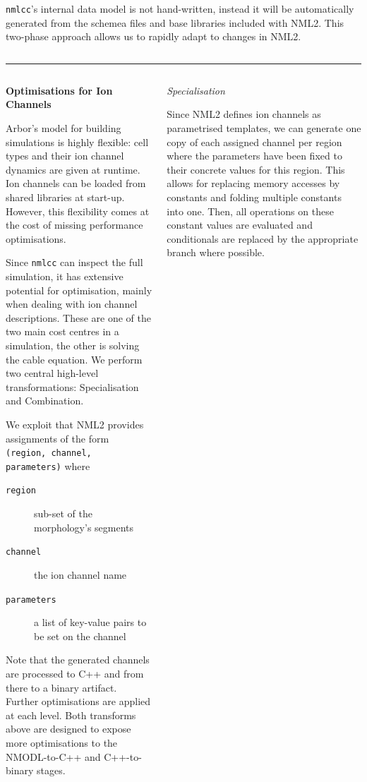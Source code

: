 \documentclass{beamer}
\begin{document}
\begin{frame}[t, fragile]
\begin{columns}
\begin{column}{0.49\textwidth}
      \texttt{nmlcc}'s internal data model is not hand-written, instead it will
      be automatically generated from the schemea files and base libraries
      included with NML2. This two-phase approach allows us to rapidly adapt to
      changes in NML2.
    \end{column}
  \end{columns}
  \vspace*{1ex}
  \textcolor{arborange}{\rule{\textwidth}{0.5ex}}
  \vspace*{-1ex}
  \begin{columns}
    \begin{column}{0.49\textwidth}
      \textbf{Optimisations for Ion Channels}

      Arbor's model for building simulations is highly flexible: cell types and
      their ion channel dynamics are given at runtime. Ion channels can be
      loaded from shared libraries at start-up. However, this flexibility comes
      at the cost of missing performance optimisations.

      Since \texttt{nmlcc} can inspect the full simulation, it has extensive
      potential for optimisation, mainly when dealing with ion channel
      descriptions. These are one of the two main cost centres in a simulation,
      the other is solving the cable equation. We perform two central high-level
      transformations: Specialisation and Combination.

      We exploit that NML2 provides assignments of the form
      \verb!(region, channel, parameters)! where
      \begin{description}
        \item[\texttt{region}] sub-set of the morphology's segments
        \item[\texttt{channel}] the ion channel name
        \item[\texttt{parameters}] a list of key-value pairs to be set on the channel
      \end{description}

      Note that the generated channels are processed to C++ and from there to a binary artifact.
      Further optimisations are applied at each level.
      Both transforms above are designed to expose more optimisations to the
      NMODL-to-C++ and C++-to-binary stages.
    \end{column}
    \begin{column}{0.49\textwidth}
      \emph{Specialisation}

      Since NML2 defines ion channels as parametrised templates, we can generate
      one copy of each assigned channel per region where the parameters have
      been fixed to their concrete values for this region. This allows for
      replacing memory accesses by constants and folding multiple constants into
      one. Then, all operations on these constant values are evaluated and
      conditionals are replaced by the appropriate branch where possible.


\end{column}
\end{columns}
\end{frame}
\end{document}
